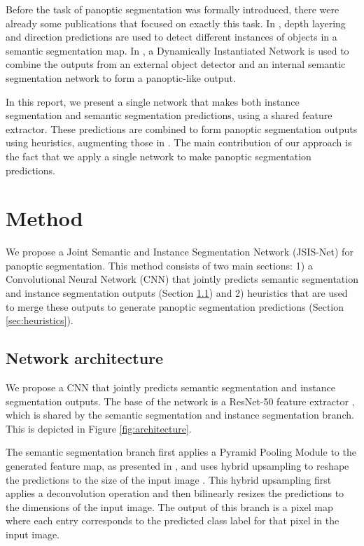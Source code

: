 \documentclass[10pt,twocolumn,letterpaper]{article}
\begin{document}
Before the task of panoptic segmentation was formally introduced, there were already some publications that focused on exactly this task. In \cite{Uhrig2016}, depth layering and direction predictions are used to detect different instances of objects in a semantic segmentation map. In \cite{Arnab2017}, a Dynamically Instantiated Network is used to combine the outputs from an external object detector and an internal semantic segmentation network to form a panoptic-like output.

In this report, we present a single network that makes both instance segmentation and semantic segmentation predictions, using a shared feature extractor. These predictions are combined to form panoptic segmentation outputs using heuristics, augmenting those in \cite{Kirillov2018}. The main contribution of our approach is the fact that we apply a single network to make panoptic segmentation predictions.


\section{Method}
We propose a Joint Semantic and Instance Segmentation Network (JSIS-Net) for panoptic segmentation. This method consists of two main sections: 1) a Convolutional Neural Network (CNN) that jointly predicts semantic segmentation and instance segmentation outputs (Section \ref{sec:network_architecture}) and 2) heuristics that are used to merge these outputs to generate panoptic segmentation predictions (Section \ref{sec:heuristics}).

\subsection{Network architecture}
\label{sec:network_architecture}
We propose a CNN that jointly predicts semantic segmentation and instance segmentation outputs. The base of the network is a ResNet-50 feature extractor \cite{He2015}, which is shared by the semantic segmentation and instance segmentation branch. This is depicted in Figure \ref{fig:architecture}.

The semantic segmentation branch first applies a Pyramid Pooling Module to the generated feature map, as presented in \cite{Zhao2017}, and uses hybrid upsampling to reshape the predictions to the size of the input image \cite{Meletis2018}. This hybrid upsampling first applies a deconvolution operation and then bilinearly resizes the predictions to the dimensions of the input image. The output of this branch is a pixel map where each entry corresponds to the predicted class label for that pixel in the input image.
\end{document}
